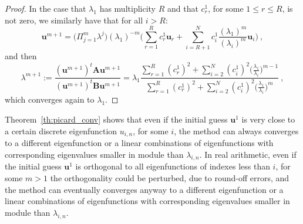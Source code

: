 \documentclass[preprint,12pt]{elsarticle}
\begin{document}
\begin{proof}
In the case that $\lambda_1$ has multiplicity $R$ and that $c_r^1$, for some $1\leq r\leq R$, is not zero,
we similarly have that for all $i>R$:
$$
\mathbf{u}^{m+1}=\Big(\Pi_{j=1}^m\lambda^{j}\Big)(\lambda_1)^{-m}\Big( \sum_{r=1}^Rc_r^1 \mathbf{u}_r+
\sum_{i=R+1}^N c_i^1\frac{(\lambda_1)^m}{(\lambda_i)^{m}}\mathbf{u}_i\Big) \ ,
$$
and then
$$
\lambda^{m+1}:=\frac{(\mathbf{u}^{m+1})^t\mathbf{A}\mathbf{u}^{m+1}}{(\mathbf{u}^{m+1})^t\mathbf{B}\mathbf{u}^{m+1}}
=\lambda_1 \frac{\displaystyle \sum_{r=1}^R(c_r^1)^2 +
\sum_{i=2}^N (c_i^1)^2\Bigg(\frac{\lambda_1}{\lambda_i}\Bigg)^{m-1}}
{\displaystyle \sum_{r=1}^R(c_r^1)^2 +
\sum_{i=2}^N (c_i^1)^2\Bigg(\frac{\lambda_1}{\lambda_i}\Bigg)^{m}}\ ,
$$
which converges again to $\lambda_1$.


\end{proof}

Theorem~\ref{th:picard_conv} shows that even if the initial guess $\mathbf{u}^1$ is very close to a certain discrete eigenfunction $u_{i,n}$, for some $i$, the method can always converges to a different eigenfunction or a linear combinations of eigenfunctions with corresponding eigenvalues smaller in module than $\lambda_{i,n}$. In real arithmetic, even if the initial guess $\mathbf{u}^1$ is orthogonal to all eigenfunctions of indexes less than $i$, for some $m>1$ the orthogonality could be perturbed, due to round-off errors, and the method can eventually converges anyway to a different eigenfunction or a linear combinations of eigenfunctions with corresponding eigenvalues smaller in module than $\lambda_{i,n}$.
%

\end{document}
